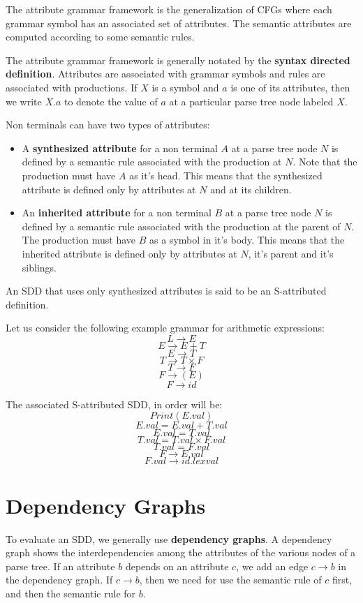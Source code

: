 \documentclass[12pt,letterpaper]{book}
\theoremstyle{definition}
\begin{document}
The attribute grammar framework is the generalization of CFGs where each grammar symbol has an associated set of attributes. The semantic attributes are computed according to some semantic rules.

The attribute grammar framework is generally notated by the \textbf{syntax directed definition}. Attributes are associated with grammar symbols and rules are associated with productions. If $X$ is a symbol and $a$ is one of its attributes, then we write $X.a$ to denote the value of $a$ at a particular parse tree node labeled $X$.

Non terminals can have two types of attributes:

\begin{itemize}
  \item A \textbf{synthesized attribute} for a non terminal $A$ at a parse tree node $N$ is defined by a semantic rule associated with the production at $N$. Note that the production must have $A$ as it's head. This means  that the synthesized attribute is defined only by attributes at $N$ and at its children.
  \item An \textbf{inherited attribute} for a non terminal $B$ at a parse tree node $N$ is defined by a semantic rule associated with the production at the parent of $N$. The production must have $B$ as a symbol in it's body. This means that the inherited attribute is defined only by attributes at $N$, it's parent and it's siblings.
\end{itemize}

An SDD that uses only synthesized attributes is said to be an S-attributed definition.

Let us consider the following example grammar for arithmetic expressions:
\[L \rightarrow E\]
\[E \rightarrow E + T\]
\[E \rightarrow T\]
\[T \rightarrow T \times F\]
\[T \rightarrow F\]
\[F \rightarrow (E)\]
\[F \rightarrow id\]

The associated S-attributed SDD, in order will be:
\[Print(E.val)\]
\[E.val = E.val + T.val\]
\[E.val = T.val\]
\[T.val = T.val \times F.val\]
\[T.val = F.val\]
\[F \rightarrow E.val\]
\[F.val \rightarrow id.lexval\]

\section{Dependency Graphs}

To evaluate an SDD, we generally use \textbf{dependency graphs}. A dependency graph shows the interdependencies among the attributes of the various nodes of a parse tree. If an attribute $b$ depends on an attribute $c$, we add an edge $c \rightarrow b$ in the dependency graph. If $c \rightarrow b$, then we need for use the semantic rule of $c$ first, and then the semantic rule for $b$.
\end{document}

